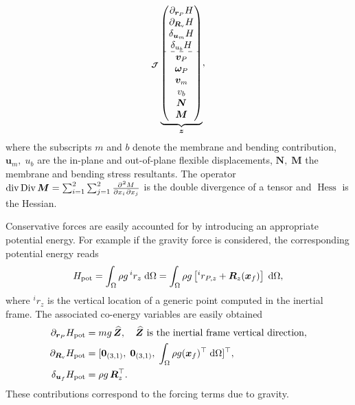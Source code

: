\documentclass{svjour3}                     %
\DeclareMathOperator*{\Div}{Div}
\renewcommand{\div}{\operatorname{div}}
\DeclareMathOperator*{\Hess}{Hess}
\begin{document}
\begin{remark}
{\begin{equation}
{}_{\bm{\mathcal{J}}}
\underbrace{\begin{pmatrix}
	\partial_{\bm{r}_P}H \\ \partial_{\bm{R}_\text{v}}H \\ \delta_{\bm{u}_{m}} H \\ \delta_{u_{b}} H \\\hdashline  \bm{v}_P \\ \bm\omega_P  \\ \bm{v}_{m} \\ {v}_{b} \\ \bm{N} \\ \bm{M} \\
	\end{pmatrix}}_{\bm{z}},
\end{equation} 
where the subscripts $m$ and $b$ denote the membrane and bending contribution, $\bm{u}_{m}, \; {u}_{b}$ are the in-plane and out-of-plane flexible displacements, $\bm{N} , \; \bm{M}$ the membrane and bending stress resultants. The operator $\div\Div \bm{M} = \sum_{i=1}^{2}\sum_{j=1}^{2} \diffp{M}{x_i,x_j}$ is the double divergence of a tensor and $\Hess$ is the Hessian.}
\end{remark}


\begin{remark}
	Conservative forces are easily accounted for by introducing an appropriate potential energy. For example if the gravity force is considered, the corresponding potential energy reads
	\begin{equation*}
	H_{\text{pot}} = \int_{\Omega} \rho g \, ^i r_z \d{\Omega} = \int_{\Omega} \rho g \left[ ^i r_{P, z} +\bm{R}_z (\bm{x}_f) \right] \d{\Omega},
	\end{equation*}
	where $^i r_z$ is the vertical location of a generic point computed in the inertial frame. The associated co-energy variables are easily obtained
	\begin{align*}
	\partial_{\bm{r}_P}H_{\text{pot}} &= m g \, \widehat{\bm{Z}}, \quad \text{$\widehat{\bm{Z}}$ is the inertial frame vertical direction},\\
	\partial_{\bm{R}_\text{v}}H_{\text{pot}} &= [\bm{0}_{(3, 1)}, \; \bm{0}_{(3, 1)}, \; \int_{\Omega} \rho g (\bm{x}_f)^\top \d{\Omega}]^\top, \\
	\delta_{\bm{u}_f} H_{\text{pot}} &= \rho g \, \bm{R}_z^\top.
	\end{align*}
	These contributions correspond to the forcing terms due to gravity.
\end{remark}
\end{document}
